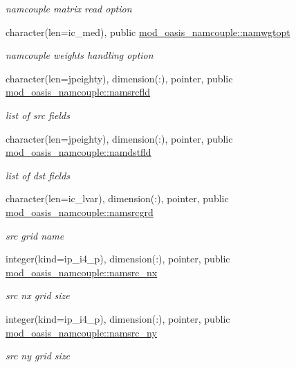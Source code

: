 \begin{DoxyCompactItemize}
\begin{DoxyCompactList}\small\item\em namcouple matrix read option \end{DoxyCompactList}\item 
character(len=ic\+\_\+med), public \hyperlink{namespacemod__oasis__namcouple_a03a63fe10e98e695e556ee190cd3accc}{mod\+\_\+oasis\+\_\+namcouple\+::namwgtopt}
\begin{DoxyCompactList}\small\item\em namcouple weights handling option \end{DoxyCompactList}\item 
character(len=jpeighty), dimension(\+:), pointer, public \hyperlink{namespacemod__oasis__namcouple_a5fcb5a4f2a49f414fafe38b03c5c089d}{mod\+\_\+oasis\+\_\+namcouple\+::namsrcfld}
\begin{DoxyCompactList}\small\item\em list of src fields \end{DoxyCompactList}\item 
character(len=jpeighty), dimension(\+:), pointer, public \hyperlink{namespacemod__oasis__namcouple_ac4cfec209e4169b6098f9a8b9be1ffb1}{mod\+\_\+oasis\+\_\+namcouple\+::namdstfld}
\begin{DoxyCompactList}\small\item\em list of dst fields \end{DoxyCompactList}\item 
character(len=ic\+\_\+lvar), dimension(\+:), pointer, public \hyperlink{namespacemod__oasis__namcouple_a589c1bae58b10bcb0cfb30c0893a7895}{mod\+\_\+oasis\+\_\+namcouple\+::namsrcgrd}
\begin{DoxyCompactList}\small\item\em src grid name \end{DoxyCompactList}\item 
integer(kind=ip\+\_\+i4\+\_\+p), dimension(\+:), pointer, public \hyperlink{namespacemod__oasis__namcouple_ac8f6c8fe3720739f3d26431a8a600506}{mod\+\_\+oasis\+\_\+namcouple\+::namsrc\+\_\+nx}
\begin{DoxyCompactList}\small\item\em src nx grid size \end{DoxyCompactList}\item 
integer(kind=ip\+\_\+i4\+\_\+p), dimension(\+:), pointer, public \hyperlink{namespacemod__oasis__namcouple_ab82c80f007b37865172ddb033a1abb36}{mod\+\_\+oasis\+\_\+namcouple\+::namsrc\+\_\+ny}
\begin{DoxyCompactList}\small\item\em src ny grid size \end{DoxyCompactList}\item 

\end{DoxyCompactItemize}

